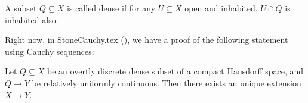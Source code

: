 \begin{definition}
  A subset $Q \subseteq X$ is called dense if for any $U\subseteq X$ open and inhabited, $U\cap Q$ is inhabited also. 
\end{definition}

Right now, in StoneCauchy.tex (), we have a proof of the following statement using Cauchy sequences:
\begin{theorem}
  Let $Q \subseteq X$ be an overtly discrete dense subset of a compact Hausdorff space, and $Q\to Y$ be relatively uniformly continuous. Then there exists an unique extension $X \to Y$. 
\end{theorem}

